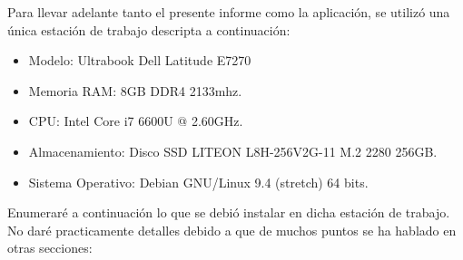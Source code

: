 Para llevar adelante tanto el presente informe como la aplicación, se utilizó una única estación
de trabajo descripta a continuación:

\begin{itemize}
\item Modelo: Ultrabook Dell Latitude E7270
\item Memoria RAM: 8GB DDR4 2133mhz.
\item CPU: Intel Core i7 6600U @ 2.60GHz.
\item Almacenamiento: Disco SSD LITEON L8H-256V2G-11 M.2 2280 256GB.
\item Sistema Operativo: Debian GNU/Linux 9.4 (stretch) 64 bits.
\end{itemize}

Enumeraré a continuación lo que se debió instalar en dicha estación de trabajo. No daré
practicamente detalles debido a que de muchos puntos se ha hablado en otras secciones:

